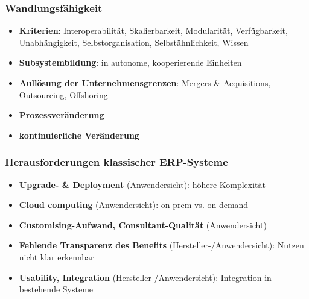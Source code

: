 \documentclass{article}
\begin{document}
\subsubsection{Wandlungsfähigkeit}
\begin{itemize}
  \item \textbf{Kriterien}: Interoperabilität, Skalierbarkeit, Modularität, Verfügbarkeit, Unabhängigkeit, Selbstorganisation, Selbstähnlichkeit, Wissen
  \item \textbf{Subsystembildung}: in autonome, kooperierende Einheiten
  \item \textbf{Aullösung der Unternehmensgrenzen}: Mergers \& Acquisitions, Outsourcing, Offshoring
  \item \textbf{Prozessveränderung}
  \item \textbf{kontinuierliche Veränderung}
\end{itemize}

\subsubsection{Herausforderungen klassischer ERP-Systeme}
\begin{itemize}
  \item \textbf{Upgrade- \& Deployment} (Anwendersicht): höhere Komplexität
  \item \textbf{Cloud computing} (Anwendersicht): on-prem vs. on-demand
  \item \textbf{Customising-Aufwand, Consultant-Qualität} (Anwendersicht)
  \item \textbf{Fehlende Transparenz des Benefits} (Hersteller-/Anwendersicht): Nutzen nicht klar erkennbar
  \item \textbf{Usability, Integration} (Hersteller-/Anwendersicht): Integration in bestehende Systeme
\end{itemize}
\end{document}
